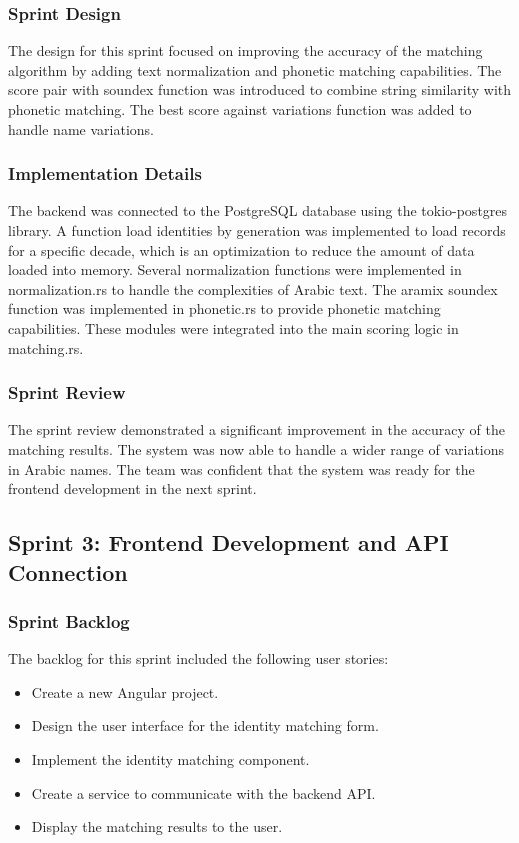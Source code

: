 \subsubsection{Sprint Design}
The design for this sprint focused on improving the accuracy of the matching algorithm by adding text normalization and phonetic matching capabilities. The score pair with soundex function was introduced to combine string similarity with phonetic matching. The best score against variations function was added to handle name variations.

\subsubsection{Implementation Details}
The backend was connected to the PostgreSQL database using the tokio-postgres library. A function load identities by generation was implemented to load records for a specific decade, which is an optimization to reduce the amount of data loaded into memory. Several normalization functions were implemented in normalization.rs to handle the complexities of Arabic text. The aramix soundex function was implemented in phonetic.rs to provide phonetic matching capabilities. These modules were integrated into the main scoring logic in matching.rs.

\subsubsection{Sprint Review}
The sprint review demonstrated a significant improvement in the accuracy of the matching results. The system was now able to handle a wider range of variations in Arabic names. The team was confident that the system was ready for the frontend development in the next sprint.

\subsection{Sprint 3: Frontend Development and API Connection}
\subsubsection{Sprint Backlog}
The backlog for this sprint included the following user stories:
\begin{itemize}
    \item Create a new Angular project.
    \item Design the user interface for the identity matching form.
    \item Implement the identity matching component.
    \item Create a service to communicate with the backend API.
    \item Display the matching results to the user.
\end{itemize}

